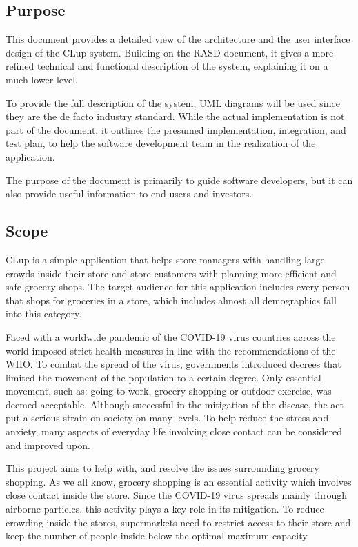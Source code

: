 \subsection{Purpose}
\hspace{\parindent}This document provides a detailed view of the architecture and the user interface design of the CLup system. Building on the RASD document, it gives a more refined technical and functional description of the system, explaining it on a much lower level. 

To provide the full description of the system, UML diagrams will be used since they are the de facto industry standard. While the actual implementation is not part of the document, it outlines the presumed implementation, integration, and test plan, to help the software development team in the realization of the application.

The purpose of the document is primarily to guide software developers, but it can also provide useful information to end users and investors.  

\newpage

\subsection{Scope}
\hspace{\parindent}CLup is a simple application that helps store managers with handling large crowds inside their store and store customers with planning more efficient and safe grocery shops. The target audience for this application includes every person that shops for groceries in a store, which includes almost all demographics fall into this category. 

Faced with a worldwide pandemic of the COVID-19 virus countries across the world imposed strict health measures in line with the recommendations of the WHO. To combat the spread of the virus, governments introduced decrees that limited the movement of the population to a certain degree. Only essential movement, such as: going to work, grocery shopping or outdoor exercise, was deemed acceptable. Although successful in the mitigation of the disease, the act put a serious strain on society on many levels. To help reduce the stress and anxiety, many aspects of everyday life involving close contact can be considered and improved upon. 

This project aims to help with, and resolve the issues surrounding grocery shopping. As we all know, grocery shopping is an essential activity which involves close contact inside the store. Since the COVID-19 virus spreads mainly through airborne particles, this activity plays a key role in its mitigation. To reduce crowding inside the stores, supermarkets need to restrict access to their store and keep the number of people inside below the optimal maximum capacity. 

